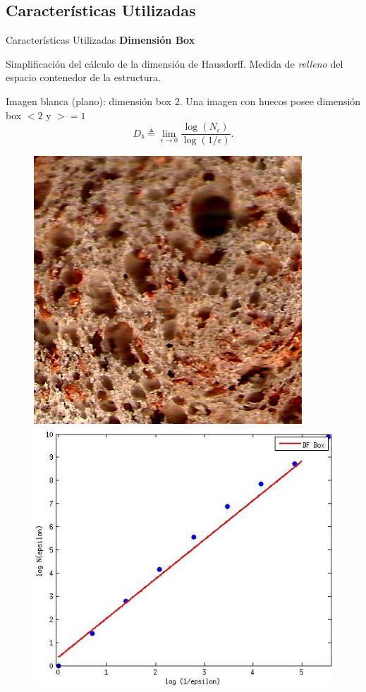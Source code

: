 \documentclass{beamer}
\begin{document}
\subsection{Caracter\'isticas Utilizadas}
\begin{frame}
{\huge Caracter\'isticas Utilizadas}
\textbf{Dimensi\'on Box}

Simplificaci\'on del c\'alculo de la dimensi\'on de Hausdorff. Medida de {\em relleno} del espacio contenedor de la estructura. 

Imagen blanca (plano): dimensi\'on box $2$. Una imagen con huecos posee dimensi\'on box $< 2$ y $>= 1$
$$D_{b} \triangleq \displaystyle\lim_{\epsilon \to 0}{\frac{\log(N_{\epsilon})}{\log (1/\epsilon)}}.$$
\begin{figure}
\centering
\includegraphics[scale=0.9]{../imagenes/salvado19}
\includegraphics[scale = 0.2]{../imagenes/fitbox}
\end{figure}
\end{frame}
\end{document}
